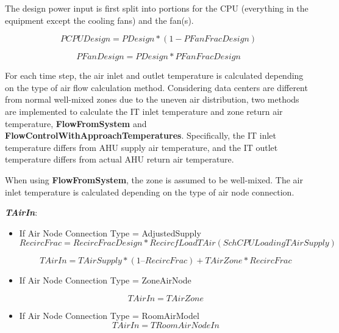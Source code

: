 The design power input is first split into portions for the CPU (everything in the equipment except the cooling fans) and the fan(s).

\begin{equation}
PCPUDesign = PDesign * (1 - PFanFracDesign)
\end{equation}

\begin{equation}
PFanDesign = PDesign * PFanFracDesign
\end{equation}

For each time step,  the air inlet and outlet temperature is calculated depending on the type of air flow calculation method. Considering data centers are different from normal well-mixed zones due to the uneven air distribution, two methods are implemented to calculate the IT inlet temperature and zone return air temperature, \textbf{FlowFromSystem} and \textbf{FlowControlWithApproachTemperatures}. Specifically, the IT inlet temperature differs from AHU supply air temperature, and the IT outlet temperature differs from actual AHU return air temperature.

When using \textbf{FlowFromSystem}, the zone is assumed to be well-mixed. The air inlet temperature is calculated depending on the type of air node connection.

\emph{\textbf{TAirIn}}:

\begin{itemize}
    \tightlist
  \item
    If Air Node Connection Type = AdjustedSupply
\begin{equation}
RecircFrac = RecircFracDesign * RecircfLoadTAir(SchCPULoading TAirSupply)
\end{equation}

\begin{equation}
TAirIn = TAirSupply * (1 – RecircFrac) +TAirZone * RecircFrac
\end{equation}

  \item
    If Air Node Connection Type = ZoneAirNode
    
\begin{equation}
TAirIn = TAirZone
\end{equation}

  \item
    If Air Node Connection Type = RoomAirModel
\begin{equation}
TAirIn = TRoomAirNodeIn
\end{equation}

\end{itemize}

